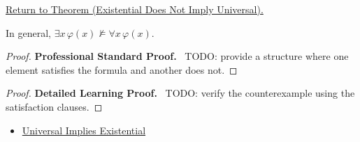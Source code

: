 \newpage
{}
\label{prf:existential-not-universal}

\begin{remark*}[Return]
\hyperref[thm:existential-not-universal]{Return to Theorem (Existential Does Not Imply Universal).}
\end{remark*}

\begin{theorem*}
In general, \(\exists x\,\varphi(x)\not\models \forall x\,\varphi(x)\).
\end{theorem*}

\begin{proof}
\textbf{Professional Standard Proof.}~
TODO: provide a structure where one element satisfies the formula and another
does not.
\end{proof}

\begin{proof}
\textbf{Detailed Learning Proof.}~
TODO: verify the counterexample using the satisfaction clauses.
\end{proof}

\begin{remark*}
\end{remark*}

\begin{dependencies}
\begin{itemize}
  \item \hyperref[thm:universal-implies-existential]{Universal Implies Existential}
\end{itemize}
\end{dependencies}

\clearpage
